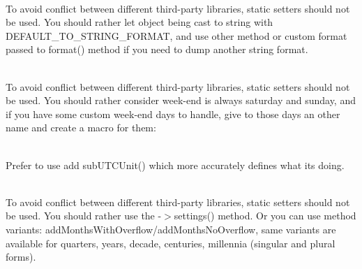 \begin{DoxyRefList}
\item[Member \doxylink{interface_carbon_1_1_carbon_interface_a623866c56dd346c45ed567f6130a79fe}{Carbon\textbackslash{}Carbon\+Interface\+::set\+To\+String\+Format} (Closure\texorpdfstring{$\vert$}{|}string\texorpdfstring{$\vert$}{|}null \$format)]\hfill \\
\label{deprecated__deprecated000138}%
%
To avoid conflict between different third-\/party libraries, static setters should not be used. You should rather let  object being cast to string with DEFAULT\+\_\+\+TO\+\_\+\+STRING\+\_\+\+FORMAT, and use other method or custom format passed to format() method if you need to dump another string format. 
\item[Member \doxylink{interface_carbon_1_1_carbon_interface_a534a3a946be31fd98418754a8d178eb6}{Carbon\textbackslash{}Carbon\+Interface\+::set\+Weekend\+Days} (array \$days)]\hfill \\
\label{deprecated__deprecated000139}%
%
To avoid conflict between different third-\/party libraries, static setters should not be used. You should rather consider week-\/end is always saturday and sunday, and if you have some custom week-\/end days to handle, give to those days an other name and create a macro for them\+: 
\item[Member \doxylink{interface_carbon_1_1_carbon_interface_a23dbd1395953e77a5a3b61590a49eddf}{Carbon\textbackslash{}Carbon\+Interface\+::sub\+Real\+Unit} (\$unit, \$value=1)]\hfill \\
\label{deprecated__deprecated000140}%
%
Prefer to use add sub\+UTCUnit() which more accurately defines what it\textquotesingle{}s doing. 
\item[Member \doxylink{interface_carbon_1_1_carbon_interface_ae94fe3a2ba07ab9ecc58da94444ae99c}{Carbon\textbackslash{}Carbon\+Interface\+::use\+Months\+Overflow} (bool \$months\+Overflow=true)]\hfill \\
\label{deprecated__deprecated000141}%
%
To avoid conflict between different third-\/party libraries, static setters should not be used. You should rather use the -\/\texorpdfstring{$>$}{>}settings() method. Or you can use method variants\+: add\+Months\+With\+Overflow/add\+Months\+No\+Overflow, same variants are available for quarters, years, decade, centuries, millennia (singular and plural forms).  
\item[Member \doxylink{interface_carbon_1_1_carbon_interface_aa717dc181044081296257fee1a601f0c}{Carbon\textbackslash{}Carbon\+Interface\+::use\+Strict\+Mode} (bool \$strict\+Mode\+Enabled=true)]\hfill \\

\end{DoxyRefList}
